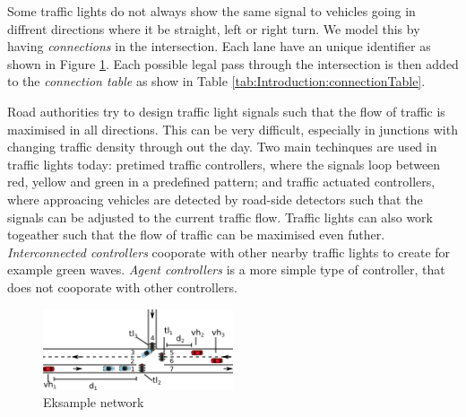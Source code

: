 Some traffic lights do not always show the same signal to vehicles going in diffrent directions where it be straight, left or right turn. 
We model this by having \textit{connections} in the intersection. Each lane have an unique identifier as shown in Figure \ref{fig:Introduction:network}. 
Each possible legal pass through the intersection is then added to the \textit{connection table} as show in Table \ref{tab:Introduction:connectionTable}.

Road authorities try to design traffic light signals such that the flow of traffic is maximised in all directions.
This can be very difficult, especially in junctions with changing traffic density through out the day.
Two main techinques are used in traffic lights today: pretimed traffic controllers, where the signals loop between red, yellow and green in a predefined pattern; and traffic actuated controllers, where approacing vehicles are detected by road-side detectors such that the signals can be adjusted to the current traffic flow.
Traffic lights can also work togeather such that the flow of traffic can be maximised even futher. 
\textit{Interconnected controllers} cooporate with other nearby traffic lights to create for example green waves.
\textit{Agent controllers} is a more simple type of controller, that does not cooporate with other controllers.




\begin{figure}[htb]
\centering
\includegraphics[width=0.5\textwidth]{images/introNetwork.png}
\caption{Eksample network}
\label{fig:Introduction:network}
\end{figure}

